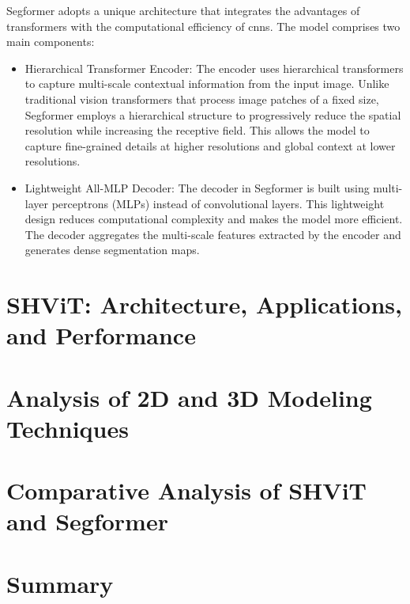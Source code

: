 Segformer adopts a unique architecture that integrates the advantages of transformers with the computational efficiency of \glspl{cnn}. The model comprises two main components:
\begin{itemize}
	\item Hierarchical Transformer Encoder: The encoder uses hierarchical transformers to capture multi-scale contextual information from the input image. Unlike traditional vision transformers that process image patches of a fixed size, Segformer employs a hierarchical structure to progressively reduce the spatial resolution while increasing the receptive field. This allows the model to capture fine-grained details at higher resolutions and global context at lower resolutions.
	
	\item Lightweight All-MLP Decoder: The decoder in Segformer is built using multi-layer perceptrons (MLPs) instead of convolutional layers. This lightweight design reduces computational complexity and makes the model more efficient. The decoder aggregates the multi-scale features extracted by the encoder and generates dense segmentation maps.
\end{itemize}



\section{SHViT: Architecture, Applications, and Performance}

\section{Analysis of 2D and 3D Modeling Techniques}

\section{Comparative Analysis of SHViT and Segformer}

\section{Summary}
